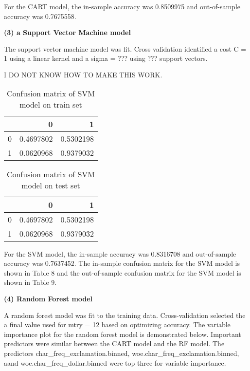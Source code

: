 \documentclass[12pt,]{article}
\begin{document}
For the CART model, the in-sample accuracy was 0.8509975 and
out-of-sample accuracy was 0.7675558.

\pagebreak

\textbf{(3) a Support Vector Machine model}

The support vector machine model was fit. Cross validation identified a
cost C = 1 using a linear kernel and a sigma = ??? using ??? support
vectors.

I DO NOT KNOW HOW TO MAKE THIS WORK.

\begin{table}[t]

\caption{\label{tab:SVM train conf matrix}Confusion matrix of SVM model on train set}
\centering
\begin{tabular}{lrr}
\toprule
  & 0 & 1\\
\midrule
\rowcolor{gray!6}  0 & 0.4697802 & 0.5302198\\
1 & 0.0620968 & 0.9379032\\
\bottomrule
\end{tabular}
\end{table}

\begin{table}[t]

\caption{\label{tab:SVM test conf matrix}Confusion matrix of SVM model on test set}
\centering
\begin{tabular}{lrr}
\toprule
  & 0 & 1\\
\midrule
\rowcolor{gray!6}  0 & 0.4697802 & 0.5302198\\
1 & 0.0620968 & 0.9379032\\
\bottomrule
\end{tabular}
\end{table}

For the SVM model, the in-sample accuracy was 0.8316708 and
out-of-sample accuracy was 0.7637452. The in-sample confusion matrix for
the SVM model is shown in Table 8 and the out-of-sample confusion matrix
for the SVM model is shown in Table 9.

\textbf{(4) Random Forest model}

A random forest model was fit to the training data. Cross-validation
selected the a final value used for mtry = 12 based on optimizing
accuracy. The variable importance plot for the random forest model is
demonstrated below. Important predictors were similar between the CART
model and the RF model. The predictors char\_freq\_exclamation.binned,
woe.char\_freq\_exclamation.binned, aand woe.char\_freq\_dollar.binned
were top three for variable importance.
\end{document}
